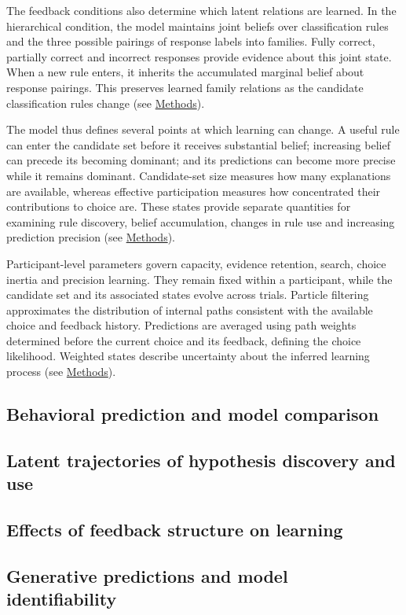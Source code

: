 The feedback conditions also determine which latent relations are learned.
In the hierarchical condition, the model maintains joint beliefs over
classification rules and the three possible pairings of response labels
into families. Fully correct, partially correct and incorrect responses
provide evidence about this joint state. When a new rule enters, it inherits
the accumulated marginal belief about response pairings. This preserves
learned family relations as the candidate classification rules change
(see \hyperref[m:pairing]{Methods}).

The model thus defines several points at which learning can change. A useful
rule can enter the candidate set before it receives substantial belief;
increasing belief can precede its becoming dominant; and its predictions can
become more precise while it remains dominant. Candidate-set size measures
how many explanations are available, whereas effective participation
measures how concentrated their contributions to choice are. These states
provide separate quantities for examining rule discovery, belief
accumulation, changes in rule use and increasing prediction precision
(see \hyperref[m:measures]{Methods}).

Participant-level parameters govern capacity, evidence retention, search,
choice inertia and precision learning. They remain fixed within a
participant, while the candidate set and its associated states evolve across
trials. Particle filtering approximates the distribution of internal paths
consistent with the available choice and feedback history. Predictions are
averaged using path weights determined before the current choice and its
feedback, defining the choice likelihood. Weighted states describe
uncertainty about the inferred learning process
(see \hyperref[m:inference]{Methods}).

\subsection*{Behavioral prediction and model comparison}
\label{r:prediction}

\subsection*{Latent trajectories of hypothesis discovery and use}
\label{r:trajectories}

\subsection*{Effects of feedback structure on learning}
\label{r:feedback}

\subsection*{Generative predictions and model identifiability}
\label{r:recovery}
